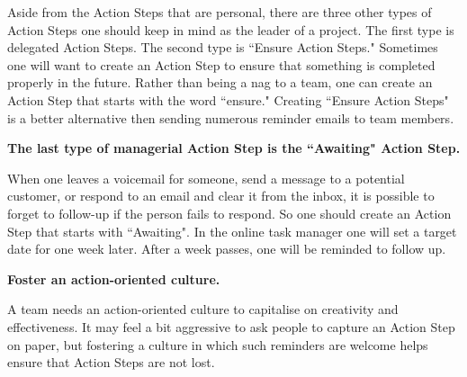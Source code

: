 Aside from the Action Steps that are personal, there are three other types of Action Steps one should keep in mind as the leader of a project. The first type is delegated Action Steps. The second type is ``Ensure Action Steps." Sometimes one will want to create an Action Step to ensure that something is completed properly in the future. Rather than being a nag to a  team, one can create an Action Step that starts with the word ``ensure." Creating ``Ensure Action Steps" is a better alternative then sending numerous reminder emails to team members.

\textbf{The last type of managerial Action Step is the ``Awaiting" Action Step.}

When one leaves a voicemail for someone, send a message to a potential customer, or respond to an email and clear it from the inbox, it is possible to forget to follow-up if the person fails to respond. So one should create an Action Step that starts with ``Awaiting". In the online task manager one will set a target date for one week later. After a week passes, one will be reminded to follow up.

\textbf{Foster an action-oriented culture.}

A team needs an action-oriented culture to capitalise on creativity and effectiveness. It may feel a bit aggressive to ask people to capture an Action Step on paper, but fostering a culture in which such reminders are welcome helps ensure that Action Steps are not lost.


